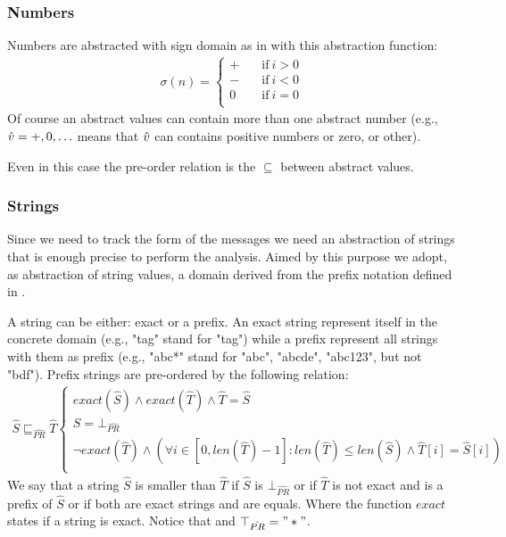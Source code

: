 \subsubsection{Numbers}
Numbers are abstracted with sign domain as in \cite{PrincipleProgramAnalysis} with this abstraction function:
\begin{align*}
\sigma (n)=
\begin{cases}
   + & \quad\text{if}\ i>0 \\
   - & \quad\text{if}\ i<0 \\
   0 & \quad\text{if}\ i=0 \\
\end{cases}
\end{align*}
Of course an abstract values can contain more than one abstract number (e.g., $\hat{v} = {+, 0, \dots}$ means that $\hat{v}$ can contains positive numbers or zero, or other). 

Even in this case the pre-order relation is the $\subseteq$ between abstract values.

\subsubsection{Strings}
Since we need to track the form of the messages we need an abstraction of strings that is enough precise to perform the analysis. Aimed by this purpose we adopt, as abstraction of string values, a domain derived from the prefix notation defined in \cite{StringAbstraction}. 

A string can be either: exact or a prefix. An exact string represent itself in the concrete domain (e.g., "tag" stand for "tag") while a prefix represent all strings with them as prefix (e.g., "abc*" stand for "abc", "abcde", "abc123", but not "bdf"). Prefix strings are pre-ordered by the following relation:
\begin{align*}
\hat{S} \sqsubseteq_{\hat{PR}} \hat{T}
\begin{cases}
    exact(\hat{S}) \wedge exact(\hat{T}) \wedge \hat{T} = \hat{S} \\ 
    S = \bot_{\hat{PR}}\\
    \neg exact(\hat{T}) \wedge (\forall i \in [0, len(\hat{T}) - 1] : len(\hat{T}) \leq len(\hat{S}) \wedge \hat{T}[i] = \hat{S}[i])\\
\end{cases}
\end{align*}
We say that a string $\hat{S}$ is smaller than $\hat{T}$ if $\hat{S}$ is $\bot_{\hat{PR}}$ or if $\hat{T}$ is not exact and is a prefix of $\hat{S}$ or if both are exact strings and are equals. Where the function $exact$ states if a string is exact.
Notice that and $\top_{\hat{PR}} = "*"$.

